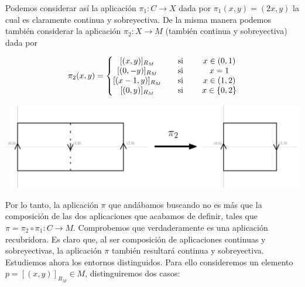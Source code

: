 \documentclass[fleqn]{article}
\begin{document}
    Podemos considerar así la aplicación $\pi_1: C \rightarrow X$ dada por $\pi_1(x,y)=(2x,y)$ la cual es claramente continua y sobreyectiva. De la misma manera
    podemos también considerar la aplicación $\pi_2 : X \rightarrow M$ (también continua y sobreyectiva) dada por

    $$\pi_2 (x,y) = 
    \left\{
        \begin{matrix}
            \relax [(x,y)]_{R_M} \quad &\text{si }& \quad x \in (0,1)\\
            \relax [(0,-y)]_{R_M} \quad &\text{si }& \quad x = 1\\
            \relax [(x-1,y)]_{R_M} \quad &\text{si }& \quad x \in (1,2)\\
            \relax [(0,y)]_{R_M} \quad &\text{si }& \quad x \in \{0,2\}
        \end{matrix}
    \right.$$

    \begin{center}
        \noindent
        \includegraphics[width=0.6\linewidth]{pi_2.png}
    \end{center}

    Por lo tanto, la aplicación $\pi$ que andábamos buscando no es más que la composición de las dos aplicaciones que acabamos de definir, tales que
    $\pi = \pi_2 \circ \pi_1 : C \rightarrow M$. Comprobemos que verdaderamente es una aplicación recubridora. Es claro que, al ser composición de 
    aplicaciones continuas y sobreyectivas, la aplicación $\pi$ también resultará continua y sobreyectiva. Estudiemos ahora los entornos distinguidos. 
    Para ello consideremos un elemento $p = [(x,y)]_{R_M} \in M$,  distinguiremos dos casos:

\newpage
\end{document}

